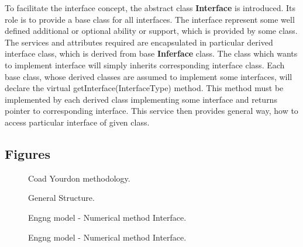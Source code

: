 \documentclass[12pt,draft]{article}
\newcommand{\class}[1]{{\bf #1}}
\begin{document}
To facilitate the interface concept, the abstract class
\class{Interface} is introduced. Its role is to provide a base class for all interfaces. 
The interface represent some well defined additional or optional ability or support, which is provided by some class.
The services and attributes required are encapsulated in particular
derived interface class, which is derived from base \class{Inferface} class.
The class which wants to implement interface will simply inherits corresponding interface class.
Each base class, whose derived classes are assumed to implement some interfaces, will declare
the virtual getInterface(InterfaceType) method. This method must be implemented by each derived class implementing
some interface and returns pointer to corresponding interface. This
service then provides general way, how to
access particular interface of given class. 
	
\begin{htmlonly}
\section{Figures}
\end{htmlonly}

\vspace*{-10mm}
\begin{figure}[tb]
\begin{center}\end{center}
\caption{Coad Yourdon methodology.}
\label{coyo}
\end{figure}


\begin{figure}[tb]
\begin{center}\end{center}
\caption{General Structure.}
\label{genstructfig}
\end{figure}


\begin{figure}[tb]
\begin{center}\end{center}
\caption{Engng model - Numerical method Interface.}
\label{engngNummet1fig}
\end{figure}



\begin{figure}[tb]
\begin{center}\end{center}
\caption{Engng model - Numerical method Interface.}
\label{engngNummet2fig}
\end{figure}
\end{document}
